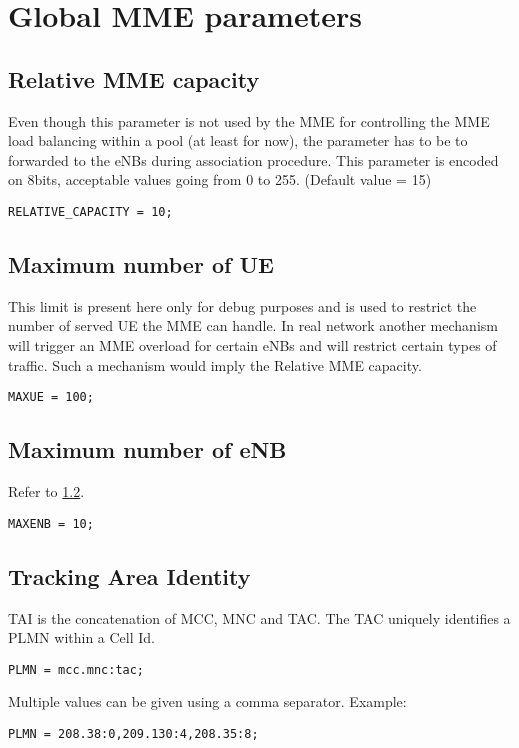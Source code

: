 \documentclass[a4paper,oneside]{report}
\begin{document}
\section{Global MME parameters}

\subsection{Relative MME capacity}
Even though this parameter is not used by the MME for controlling the MME load
balancing within a pool (at least for now), the parameter has to be to forwarded
to the eNBs during association procedure.
This parameter is encoded on 8bits, acceptable values going from 0 to 255.
(Default value = 15)
\begin{lstlisting}
RELATIVE_CAPACITY = 10;
\end{lstlisting}

\subsection{Maximum number of UE}
\label{sec:Maximum number of UE}
This limit is present here only for debug purposes and is used to restrict
the number of served UE the MME can handle. In real network another mechanism
will trigger an MME overload for certain eNBs and will restrict certain types of
traffic. Such a mechanism would imply the Relative MME capacity.
\begin{lstlisting}
MAXUE = 100;
\end{lstlisting}

\subsection{Maximum number of eNB}
Refer to \ref{sec:Maximum number of UE}.
\begin{lstlisting}
MAXENB = 10;
\end{lstlisting}

\subsection{Tracking Area Identity}
TAI is the concatenation of
MCC, MNC and
TAC.
The TAC uniquely identifies a PLMN within a Cell Id.
\begin{lstlisting}
PLMN = mcc.mnc:tac;
\end{lstlisting}
Multiple values can be given using a comma separator. Example:
\begin{lstlisting}
PLMN = 208.38:0,209.130:4,208.35:8;
\end{lstlisting}
\end{document}
